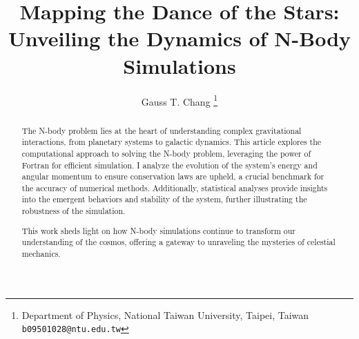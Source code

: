 \documentclass[a4paper, 12pt, oneside, onecolumn]{article}
\begin{document}
\title{Mapping the Dance of the Stars:\\Unveiling the Dynamics of N-Body Simulations}
\author{Gauss T. Chang
\thanks{Department of Physics, National Taiwan University, Taipei, Taiwan 
\texttt{b09501028@ntu.edu.tw}}}


\date{}
\maketitle
\begin{abstract}
	The N-body problem lies at the heart of understanding complex gravitational interactions, from planetary systems to galactic dynamics. This article explores the computational approach to solving the N-body problem, leveraging the power of Fortran for efficient simulation. I analyze the evolution of the system's energy and angular momentum to ensure conservation laws are upheld, a crucial benchmark for the accuracy of numerical methods. Additionally, statistical analyses provide insights into the emergent behaviors and stability of the system, further illustrating the robustness of the simulation.

	This work sheds light on how N-body simulations continue to transform our understanding of the cosmos, offering a gateway to unraveling the mysteries of celestial mechanics.
\end{abstract}
\end{document}
